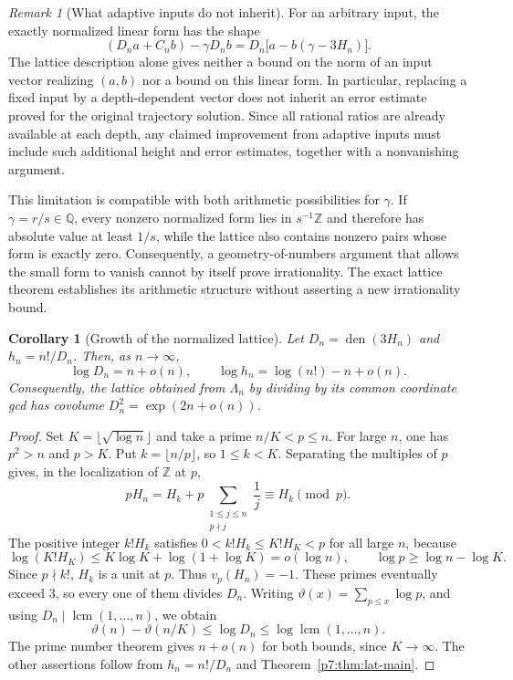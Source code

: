 \documentclass[11pt,a4paper]{article}
\newtheorem{corollary}[theorem]{Corollary}
\theoremstyle{definition}
\theoremstyle{remark}
\newtheorem{remark}[theorem]{Remark}
\newcommand{\Q}{\mathbb Q}
\newcommand{\Z}{\mathbb Z}
\DeclareMathOperator{\den}{den}
\DeclareMathOperator{\lcm}{lcm}
\numberwithin{equation}{section}
\begin{document}
\begin{remark}[What adaptive inputs do not inherit]\label{p7:rem:lat-scope}
For an arbitrary input, the exactly normalized linear form has the shape
\[
(D_na+C_nb)-\gamma D_nb
=D_n\bigl[a-b(\gamma-3H_n)\bigr].
\]
The lattice description alone gives neither a bound on the norm of an
input vector realizing $(a,b)$ nor a bound on this linear form.  In
particular, replacing a fixed input by a depth-dependent vector does not
inherit an error estimate proved for the original trajectory solution.
Since all rational ratios are already available at each depth, any claimed
improvement from adaptive inputs must include such additional height and
error estimates, together with a nonvanishing argument.

This limitation is compatible with both arithmetic possibilities for
$\gamma$.  If $\gamma=r/s\in\Q$, every nonzero normalized form lies
in $s^{-1}\Z$ and therefore has absolute value at least $1/s$, while
the lattice also contains nonzero pairs whose form is exactly zero.
Consequently, a geometry-of-numbers argument that allows the small form
to vanish cannot by itself prove irrationality.  The exact lattice
theorem establishes its arithmetic structure without asserting a new
irrationality bound.
\end{remark}


\begin{corollary}[Growth of the normalized lattice]
\label{p7:cor:lat-denominator-growth}
Let $D_n=\den(3H_n)$ and $h_n=n!/D_n$. Then, as $n\to\infty$,
\[
 \log D_n=n+o(n),\qquad
 \log h_n=\log(n!)-n+o(n).
\]
Consequently, the lattice obtained from $\Lambda_n$ by dividing by its
common coordinate gcd has covolume
$D_n^2=\exp(2n+o(n))$.
\end{corollary}
\begin{proof}
Set $K=\lfloor\sqrt{\log n}\rfloor$ and take a prime
$n/K<p\le n$. For large $n$, one has $p^2>n$ and $p>K$.
Put $k=\lfloor n/p\rfloor$, so $1\le k<K$. Separating the multiples of
$p$ gives, in the localization of $\Z$ at $p$,
\[
 pH_n
 =H_k+p\sum_{\substack{1\le j\le n\\p\nmid j}}\frac1j
 \equiv H_k\pmod p.
\]
The positive integer $k!H_k$ satisfies $0<k!H_k\le K!H_K<p$
for all large $n$, because
\[
 \log(K!H_K)\le K\log K+\log(1+\log K)=o(\log n),
 \qquad \log p\ge\log n-\log K.
\]
Since $p\nmid k!$, $H_k$ is a unit at $p$. Thus $v_p(H_n)=-1$.
These primes eventually exceed $3$, so every one of them divides $D_n$.
Writing $\vartheta(x)=\sum_{p\le x}\log p$, and using
$D_n\mid\lcm(1,\ldots,n)$, we obtain
\[
 \vartheta(n)-\vartheta(n/K)
 \le\log D_n\le\log\lcm(1,\ldots,n).
\]
The prime number theorem gives $n+o(n)$ for both bounds, since
$K\to\infty$. The other assertions follow from $h_n=n!/D_n$ and
Theorem~\ref{p7:thm:lat-main}.
\end{proof}
\end{document}
